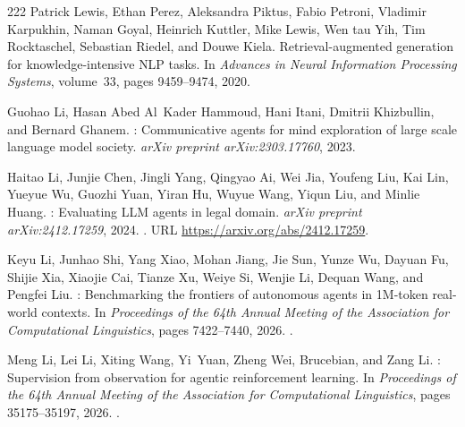 \begin{thebibliography}{222}
Patrick Lewis, Ethan Perez, Aleksandra Piktus, Fabio Petroni, Vladimir
  Karpukhin, Naman Goyal, Heinrich Kuttler, Mike Lewis, Wen tau Yih, Tim
  Rocktaschel, Sebastian Riedel, and Douwe Kiela.
\newblock Retrieval-augmented generation for knowledge-intensive {NLP} tasks.
\newblock In \emph{Advances in Neural Information Processing Systems},
  volume~33, pages 9459--9474, 2020.

Guohao Li, Hasan Abed Al~Kader Hammoud, Hani Itani, Dmitrii Khizbullin, and
  Bernard Ghanem.
: Communicative agents for mind exploration of large scale
  language model society.
\newblock \emph{arXiv preprint arXiv:2303.17760}, 2023.

Haitao Li, Junjie Chen, Jingli Yang, Qingyao Ai, Wei Jia, Youfeng Liu, Kai Lin,
  Yueyue Wu, Guozhi Yuan, Yiran Hu, Wuyue Wang, Yiqun Liu, and Minlie Huang.
: Evaluating {LLM} agents in legal domain.
\newblock \emph{arXiv preprint arXiv:2412.17259}, 2024.
\newblock {}.
\newblock URL \url{https://arxiv.org/abs/2412.17259}.

Keyu Li, Junhao Shi, Yang Xiao, Mohan Jiang, Jie Sun, Yunze Wu, Dayuan Fu,
  Shijie Xia, Xiaojie Cai, Tianze Xu, Weiye Si, Wenjie Li, Dequan Wang, and
  Pengfei Liu.
: Benchmarking the frontiers of autonomous agents in
  1{M}-token real-world contexts.
\newblock In \emph{Proceedings of the 64th Annual Meeting of the Association
  for Computational Linguistics}, pages 7422--7440, 2026{}.
\newblock {}.

Meng Li, Lei Li, Xiting Wang, Yi~Yuan, Zheng Wei, Brucebian, and Zang Li.
: Supervision from observation for agentic reinforcement
  learning.
\newblock In \emph{Proceedings of the 64th Annual Meeting of the Association
  for Computational Linguistics}, pages 35175--35197, 2026{}.
\newblock {}.


\end{thebibliography}
